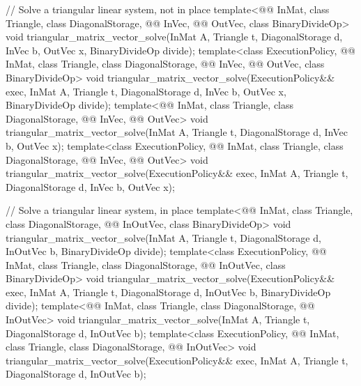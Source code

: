 \begin{codeblock}
{  // Solve a triangular linear system, not in place
  template<@@ InMat, class Triangle, class DiagonalStorage,
           @@ InVec, @@ OutVec, class BinaryDivideOp>
    void triangular_matrix_vector_solve(InMat A, Triangle t, DiagonalStorage d,
                                        InVec b, OutVec x, BinaryDivideOp divide);
  template<class ExecutionPolicy, @@ InMat, class Triangle, class DiagonalStorage,
           @@ InVec, @@ OutVec, class BinaryDivideOp>
    void triangular_matrix_vector_solve(ExecutionPolicy&& exec,
                                        InMat A, Triangle t, DiagonalStorage d,
                                        InVec b, OutVec x, BinaryDivideOp divide);
  template<@@ InMat, class Triangle, class DiagonalStorage,
           @@ InVec, @@ OutVec>
    void triangular_matrix_vector_solve(InMat A, Triangle t, DiagonalStorage d,
                                        InVec b, OutVec x);
  template<class ExecutionPolicy, @@ InMat, class Triangle, class DiagonalStorage,
           @@ InVec, @@ OutVec>
    void triangular_matrix_vector_solve(ExecutionPolicy&& exec,
                                        InMat A, Triangle t, DiagonalStorage d,
                                        InVec b, OutVec x);

  // Solve a triangular linear system, in place
  template<@@ InMat, class Triangle, class DiagonalStorage,
           @@ InOutVec, class BinaryDivideOp>
    void triangular_matrix_vector_solve(InMat A, Triangle t, DiagonalStorage d,
                                        InOutVec b, BinaryDivideOp divide);
  template<class ExecutionPolicy, @@ InMat, class Triangle, class DiagonalStorage,
           @@ InOutVec, class BinaryDivideOp>
    void triangular_matrix_vector_solve(ExecutionPolicy&& exec,
                                        InMat A, Triangle t, DiagonalStorage d,
                                        InOutVec b, BinaryDivideOp divide);
  template<@@ InMat, class Triangle, class DiagonalStorage, @@ InOutVec>
    void triangular_matrix_vector_solve(InMat A, Triangle t, DiagonalStorage d, InOutVec b);
  template<class ExecutionPolicy,
           @@ InMat, class Triangle, class DiagonalStorage, @@ InOutVec>
    void triangular_matrix_vector_solve(ExecutionPolicy&& exec,
                                        InMat A, Triangle t, DiagonalStorage d, InOutVec b);

}
\end{codeblock}
